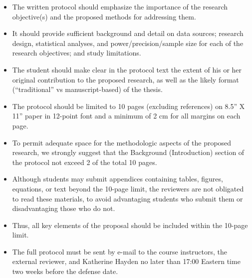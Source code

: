 \documentclass[12pt]{memoir}
\begin{document}
\begin{itemize}
    \item The written protocol should emphasize the importance of the research objective(s) and the proposed methods for addressing them.
    \item It should provide sufficient background and detail on data sources; research design, statistical analyses, and power/precision/sample size for each of the research objectives; and study limitations.
    \item The student should make clear in the protocol text the extent of his or her original contribution to the proposed research, as well as the likely format (“traditional” vs manuscript-based) of the thesis.
    \item The protocol should be limited to 10 pages (excluding references) on 8.5” X 11” paper in 12-point font and a minimum of 2 cm for all margins on each page.
    \item To permit adequate space for the methodologic aspects of the proposed research, we strongly suggest that the Background (Introduction) section of the protocol not exceed 2 of the total 10 pages.
    \item Although students may submit appendices containing tables, figures, equations, or text beyond the 10-page limit, the reviewers are not obligated to read these materials, to avoid advantaging students who submit them or disadvantaging those who do not.
    \item Thus, all key elements of the proposal should be included within the 10-page limit.
    \item The full protocol must be sent by e-mail to the course instructors, the external reviewer, and Katherine Hayden no later than 17:00 Eastern time two weeks before the defense date.
\end{itemize}

\newpage


\end{document}
